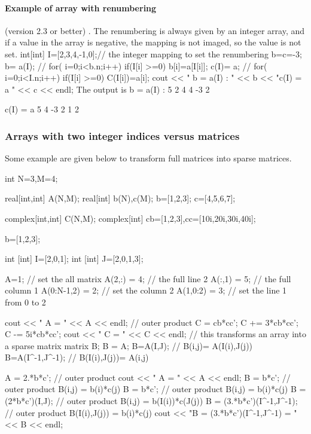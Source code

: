 \documentclass[a4paper,twoside,12pt]{book}
\def\n{\nabla}
\begin{document}
\paragraph{Example of array with renumbering}    (version 2.3 or better) .
The renumbering is always given by an integer array, and if a value in the array
is negative, the mapping is not imaged, so the value is not set.
  
\bFF
int[int] I=[2,3,4,-1,0];// the integer mapping to set the renumbering
b=c=-3;
b= a(I); // for( i=0;i<b.n;i++) if(I[i] >=0)  b[i]=a[I[i]];
c(I)= a; // for( i=0;i<I.n;i++) if(I[i] >=0)  C(I[i])=a[i];
cout << " b = a(I) : " << b << "\n  c(I) = a " << c << endl;
\eFF
The output is
\bFF
 b = a(I) : 5
          2       4       4      -3       2

  c(I) = a 5
          4      -3       2       1       2
\eFF

\subsubsection{Arrays with two integer indices versus matrices}

 Some example are given below to transform full matrices into sparse matrices.
  
\bFF

  int N=3,M=4;

  real[int,int] A(N,M);
  real[int]  b(N),c(M);
  b=[1,2,3];
  c=[4,5,6,7];

  complex[int,int]  C(N,M);
  complex[int]  cb=[1,2,3],cc=[10i,20i,30i,40i];


  b=[1,2,3];

  int [int] I=[2,0,1];
  int [int] J=[2,0,1,3];

  A=1; // set the all matrix
  A(2,:) = 4; //  the full line 2
  A(:,1) = 5; //  the full column 1
  A(0:N-1,2) = 2; // set the column 2
  A(1,0:2) = 3; // set the line 1 from 0 to 2

  cout << " A = " << A << endl;
  // outer product
  C  =  cb*cc';
  C +=  3*cb*cc';
  C -=  5i*cb*cc';
  cout << " C = " << C << endl;
  // this transforms an array into a sparse matrix
  matrix B;
  B = A;
  B=A(I,J); // B(i,j)= A(I(i),J(j))
  B=A(I^-1,J^-1);  // B(I(i),J(j))= A(i,j)

  A = 2.*b*c'; // outer product
  cout << " A = " << A << endl;
  B = b*c'; // outer product  B(i,j)  = b(i)*c(j)
  B = b*c'; // outer product  B(i,j)  = b(i)*c(j)
  B = (2*b*c')(I,J); //   outer product  B(i,j)  = b(I(i))*c(J(j))
  B = (3.*b*c')(I^-1,J^-1); // outer product  B(I(i),J(j))  = b(i)*c(j)
  cout << "B = (3.*b*c')(I^-1,J^-1) =  " << B << endl;
\end{document}
